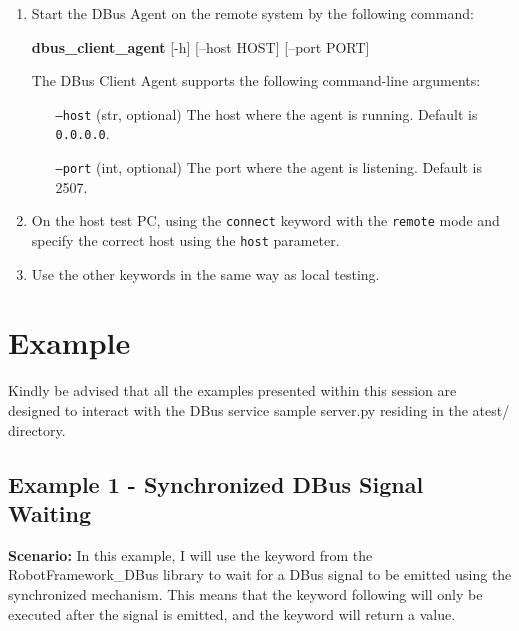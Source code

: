 \begin{enumerate}
    \item Start the DBus Agent on the remote system by the following command:

		\textbf{dbus\_client\_agent} [-h] [--host HOST] [--port PORT]

		The DBus Client Agent supports the following command-line arguments:

		\begin{itemize}
			\setlength{\itemindent}{10em}
			\item [\texttt{--host} (str, optional)] The host where the agent is running. Default is \texttt{0.0.0.0}.
			\item [\texttt{--port} (int, optional)] The port where the agent is listening. Default is 2507.
		\end{itemize}


    \item On the host test PC, using the \texttt{connect} keyword with the \texttt{remote} mode and specify the correct host using the \texttt{host} parameter.
    \item Use the other keywords in the same way as local testing.
\end{enumerate}


\hypertarget{example}{%
\section{Example}\label{example}}


Kindly be advised that all the examples presented within this session are designed to interact with the DBus service sample server.py residing in the atest/ directory.

\newpage
\hypertarget{description-example1}{%
\subsection{\texorpdfstring{\textbf{Example 1 - Synchronized DBus Signal Waiting}}{Example 1 - Synchronized DBus Signal Waiting}}\label{description-example1}}

\textbf{Scenario:} 
In this example, I will use the  keyword from the RobotFramework\_DBus library to wait for a DBus signal to be emitted using the synchronized mechanism.
This means that the keyword following  will only be executed after the signal is emitted, and the  keyword will return a value.


